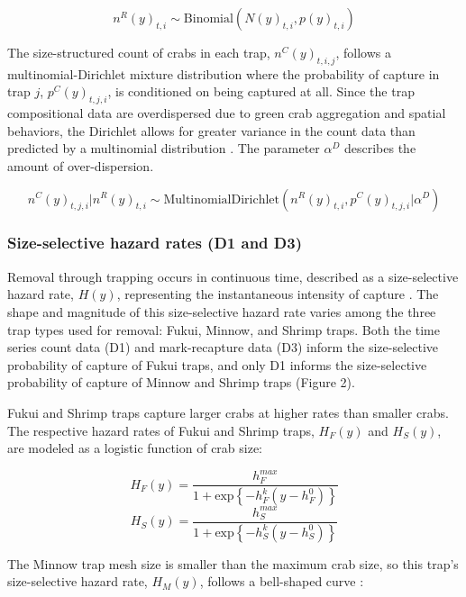 \documentclass{article}
\begin{document}
\begin{equation}
n^R(y)_{t,i} \sim \text{Binomial}(N(y)_{t,i}, p(y)_{t,i})
\end{equation}

The size-structured count of crabs in each trap, $n^C(y)_{t,i,j}$, follows a multinomial-Dirichlet mixture distribution where the probability of capture in trap $j$, $p^C(y)_{t,j,i}$, is conditioned on being captured at all. Since the trap compositional data are overdispersed due to green crab aggregation and spatial behaviors, the Dirichlet allows for greater variance in the count data than predicted by a multinomial distribution \parencite{thorson2017model}. The parameter $\alpha^D$ describes the amount of over-dispersion.

\begin{equation}
n^C(y)_{t,j,i} | n^R(y)_{t,i} \sim \text{MultinomialDirichlet}(n^R(y)_{t,i}, p^C(y)_{t,j,i}| \alpha^D)
\end{equation}

\subsubsection*{Size-selective hazard rates (D1 and D3)}

Removal through trapping occurs in continuous time, described as a size-selective hazard rate, $H(y)$, representing the instantaneous intensity of capture \parencite{ergon2018utility}. The shape and magnitude of this size-selective hazard rate varies among the three trap types used for removal: Fukui, Minnow, and Shrimp traps. Both the time series count data (D1) and mark-recapture data (D3) inform the size-selective probability of capture of Fukui traps, and only D1 informs the size-selective probability of capture of Minnow and Shrimp traps (Figure 2). 

Fukui and Shrimp traps capture larger crabs at higher rates than smaller crabs. The respective hazard rates of Fukui and Shrimp traps, $H_F(y)$ and $H_S(y)$, are modeled as a logistic function of crab size:

\begin{equation}
H_F(y) = \frac{h^{max}_F}{1+\text{exp}\left\{-h^k_F(y-h^0_F)\right\}}
\end{equation}
\begin{equation}
H_S(y) = \frac{h^{max}_S}{1+\text{exp}\left\{-h^k_S(y-h^0_S)\right\}}
\end{equation}

The Minnow trap mesh size is smaller than the maximum crab size, so this trap's size-selective hazard rate, $H_M(y)$, follows a bell-shaped curve \parencite{jorgensen2009size}:
\end{document}
